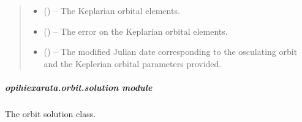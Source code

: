 \documentclass[letterpaper,11pt,english]{sphinxmanual}
\begin{document}
\begin{savenotes}
\begin{fulllineitems}
\begin{savenotes}
\begin{fulllineitems}
\begin{quote}
\begin{description}
\sphinxAtStartPar
\begin{itemize}
\item {} 
\sphinxAtStartPar
{} () – The Keplarian orbital elements.

\item {} 
\sphinxAtStartPar
{} () – The error on the Keplarian orbital elements.

\item {} 
\sphinxAtStartPar
{} () – The modified Julian date corresponding to the osculating orbit and
the Keplerian orbital parameters provided.

\end{itemize}


\end{description}\end{quote}

\end{fulllineitems}\end{savenotes}


\end{fulllineitems}\end{savenotes}


\sphinxstepscope


\subparagraph{opihiexarata.orbit.solution module}
\label{\detokenize{code/opihiexarata.orbit.solution:module-opihiexarata.orbit.solution}}\label{\detokenize{code/opihiexarata.orbit.solution:opihiexarata-orbit-solution-module}}\label{\detokenize{code/opihiexarata.orbit.solution::doc}}
\sphinxAtStartPar
The orbit solution class.
\end{document}
